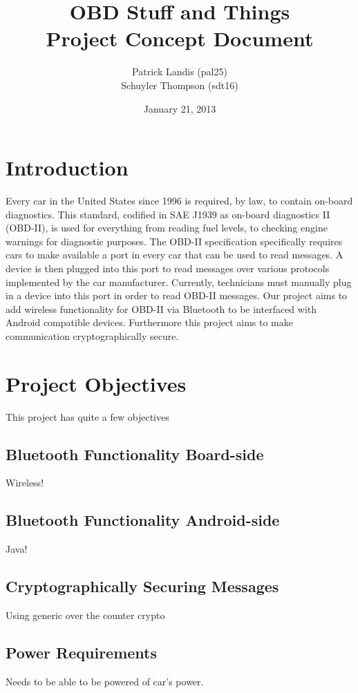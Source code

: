 \documentclass[12pt,letterpaper]{article}
\title{
\textbf{\LARGE OBD Stuff and Things} \\
\Large Project Concept Document
}
\author{
\normalsize Patrick Landis (pal25) \\
\normalsize Schuyler Thompson (sdt16)
}
\date{\normalsize January 21, 2013}
\begin{document}
\maketitle

\section{Introduction}
Every car in the United States since 1996 is required, by law, to contain on-board diagnostics. This standard, codified in SAE J1939 as on-board diagnostics II (OBD-II), is used for everything from reading fuel levels, to checking engine warnings for diagnostic purposes. The OBD-II specification specifically requires cars to make available a port in every car that can be used to read messages. A device is then plugged into this port to read messages over various protocols implemented by the car manufacturer. Currently, technicians must manually plug in a device into this port in order to read OBD-II messages. Our project aims to add wireless functionality for OBD-II via Bluetooth to be interfaced with Android compatible devices. Furthermore this project aims to make communication cryptographically secure.


\section{Project Objectives}
This project has quite a few objectives

\subsection{Bluetooth Functionality Board-side}
Wireless!

\subsection{Bluetooth Functionality Android-side}
Java!

\subsection{Cryptographically Securing Messages}
Using generic over the counter crypto

\subsection{Power Requirements}
Needs to be able to be powered of car's power.
\end{document}
